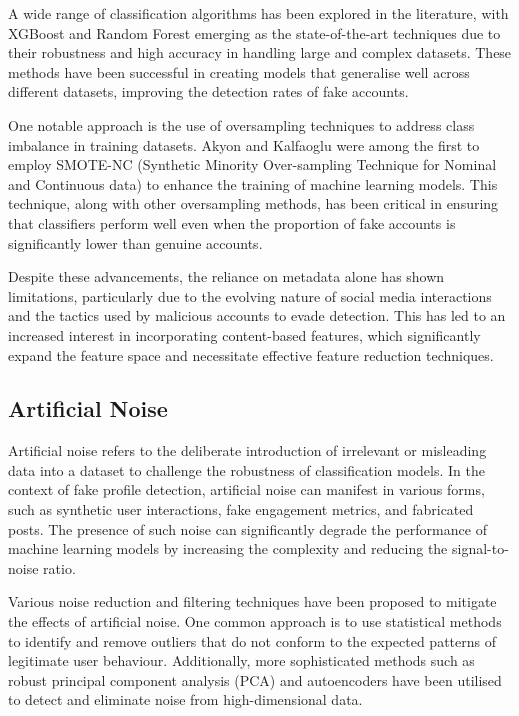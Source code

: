 \documentclass[conference]{IEEEtran}
\begin{document}
A wide range of classification algorithms has been explored in the literature, with XGBoost and Random Forest emerging as the state-of-the-art techniques due to their robustness and high accuracy in handling large and complex datasets\cite{AkyonKalfaoglu2019,EkosputraEtAl2021,HarishEtAl2023,KaushikEtAl2022}. These methods have been successful in creating models that generalise well across different datasets, improving the detection rates of fake accounts.

One notable approach is the use of oversampling techniques to address class imbalance in training datasets. Akyon and Kalfaoglu\cite{AkyonKalfaoglu2019} were among the first to employ SMOTE-NC (Synthetic Minority Over-sampling Technique for Nominal and Continuous data) to enhance the training of machine learning models. This technique, along with other oversampling methods, has been critical in ensuring that classifiers perform well even when the proportion of fake accounts is significantly lower than genuine accounts.

Despite these advancements, the reliance on metadata alone has shown limitations, particularly due to the evolving nature of social media interactions and the tactics used by malicious accounts to evade detection. This has led to an increased interest in incorporating content-based features, which significantly expand the feature space and necessitate effective feature reduction techniques\cite{EzarfelixEtAl2022}.

\subsection{Artificial Noise}

Artificial noise refers to the deliberate introduction of irrelevant or misleading data into a dataset to challenge the robustness of classification models. In the context of fake profile detection, artificial noise can manifest in various forms, such as synthetic user interactions, fake engagement metrics, and fabricated posts. The presence of such noise can significantly degrade the performance of machine learning models by increasing the complexity and reducing the signal-to-noise ratio.

Various noise reduction and filtering techniques have been proposed to mitigate the effects of artificial noise. One common approach is to use statistical methods to identify and remove outliers that do not conform to the expected patterns of legitimate user behaviour. Additionally, more sophisticated methods such as robust principal component analysis (PCA) and autoencoders have been utilised to detect and eliminate noise from high-dimensional data\cite{SallahEtAl2022,SansonettiEtAl2020}.
\end{document}
